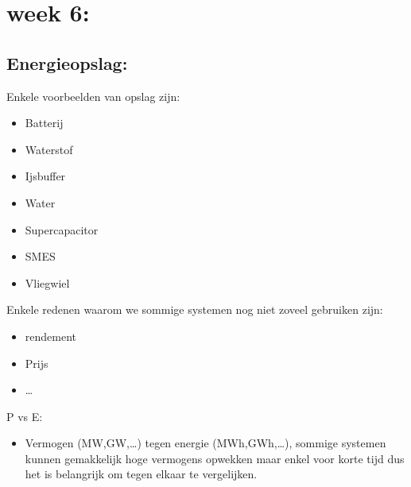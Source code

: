 \documentclass[12pt]{article}
\begin{document}
\section{week 6:}
\subsection{Energieopslag:}
Enkele voorbeelden van opslag zijn:\begin{itemize}
    \item Batterij 
    \item Waterstof 
    \item Ijsbuffer 
    \item Water 
    \item Supercapacitor 
    \item SMES 
    \item Vliegwiel
\end{itemize}
Enkele redenen waarom we sommige systemen nog niet zoveel gebruiken zijn:\begin{itemize}
    \item rendement 
    \item Prijs 
    \item \dots 
\end{itemize}
P vs E:\begin{itemize}
    \item Vermogen (MW,GW,\dots) tegen energie (MWh,GWh,\dots), sommige systemen kunnen gemakkelijk hoge vermogens opwekken maar enkel voor korte tijd dus het is belangrijk om tegen elkaar te vergelijken.
\end{itemize}
\end{document}
